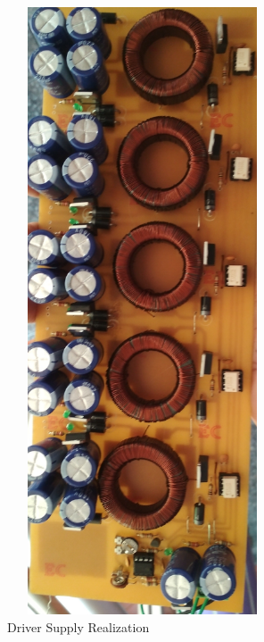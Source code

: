 \documentclass[12pt,a4paper]{report}
\begin{document}
\noindent\begin{minipage}{8cm}
	\begin{figure}[H]
		\begin{center}
			\includegraphics[width=8cm,height=18cm]{figures/driver.jpg}
		\end{center}
			\caption{Driver Supply Realization}
	\end{figure}
\end{minipage}
\end{document}

